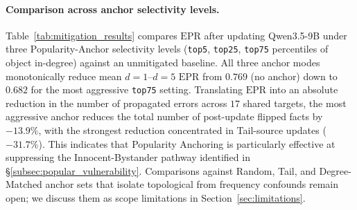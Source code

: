 \paragraph{Comparison across anchor selectivity levels.}
Table~\ref{tab:mitigation_results} compares $\mathrm{EPR}$ after updating Qwen3.5-9B under three Popularity-Anchor selectivity levels (\texttt{top5}, \texttt{top25}, \texttt{top75} percentiles of object in-degree) against an unmitigated baseline. All three anchor modes monotonically reduce mean $d{=}1$--$d{=}5$ $\mathrm{EPR}$ from $0.769$ (no anchor) down to $0.682$ for the most aggressive \texttt{top75} setting. Translating $\mathrm{EPR}$ into an absolute reduction in the number of propagated errors across $17$ shared targets, the most aggressive anchor reduces the total number of post-update flipped facts by $-13.9\%$, with the strongest reduction concentrated in Tail-source updates ($-31.7\%$). This indicates that Popularity Anchoring is particularly effective at suppressing the Innocent-Bystander pathway identified in §\ref{subsec:popular_vulnerability}. Comparisons against Random, Tail, and Degree-Matched anchor sets that isolate topological from frequency confounds remain open; we discuss them as scope limitations in Section~\ref{sec:limitations}.

